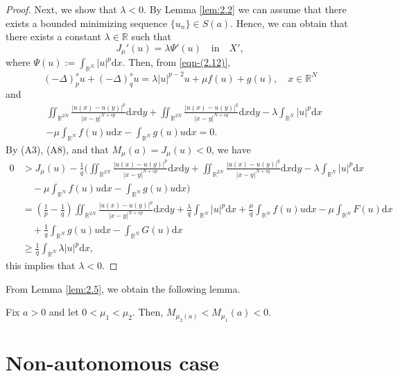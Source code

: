 \documentclass[reqno]{amsart}
\begin{document}
\begin{proof}
Next, we show that $\lambda<0$. By Lemma \ref{lem:2.2} we can assume that there 
exists a bounded minimizing sequence $\{u_n\}\in S(a)$.
Hence, we can obtain that there exists a constant $\lambda\in\mathbb{R}$ 
such that
\begin{equation}\label{eqn-(2.12)}
J_\mu'(u)=\lambda\Psi'(u)\quad  \text{in} \quad X',
\end{equation}
where $\Psi(u):=\int_{\mathbb{R}^N}|u|^{p}\mathrm{d}x$.
Then, from \eqref{eqn-(2.12)},
$$
(-\Delta)_p^{s} u+(-\Delta)_q^{s} u=\lambda |u|^{p-2}u+\mu f(u)+g(u),\quad
 x\in\mathbb{R}^N
$$
and
\begin{align*}
&\iint_{\mathbb{R}^{2N}}\frac{|u(x)-u(y)|^{p}}{|x-y|^{N+sp}}\mathrm{d}x\mathrm{d}y+\iint_{\mathbb{R}^{2N}}\frac{|u(x)-u(y)|^{q}}{|x-y|^{N+sq}}\mathrm{d}x\mathrm{d}y-\lambda \int_{\mathbb{R}^N} |u|^{p}\mathrm{d}x\\
&-\mu \int_{\mathbb{R}^N}f(u)u\mathrm{d}x-\int_{\mathbb{R}^N} g(u)u\mathrm{d}x=0.
\end{align*}
By (A3), (A8), and  that $M_\mu(a)=J_\mu(u)<0$,  we have
\begin{align*}
0&> J_\mu(u)-\frac{1}{q}(\iint_{\mathbb{R}^{2N}}
 \frac{|u(x)-u(y)|^{p}}{|x-y|^{N+sp}}\mathrm{d}x\mathrm{d}y
 +\iint_{\mathbb{R}^{2N}}\frac{|u(x)-u(y)|^{q}}{|x-y|^{N+sq}}\mathrm{d}x
 \mathrm{d}y-\lambda\int_{\mathbb{R}^N} |u|^{p}\mathrm{d}x\\
&\quad -\mu\int_{\mathbb{R}^N} f(u)u\mathrm{d}x-\int_{\mathbb{R}^N}g(u)u\mathrm{d}x)\\
&= (\frac{1}{p}-\frac{1}{q})\iint_{\mathbb{R}^{2N}}\frac{|u(x)-u(y)|^{p}}{|x-y|^{N+sp}}
 \mathrm{d}x\mathrm{d}y+\frac{\lambda}{q}\int_{\mathbb{R}^N} |u|^{p}\mathrm{d}x
 +\frac{\mu}{q} \int_{\mathbb{R}^N} f(u)u\mathrm{d}x-\mu\int_{\mathbb{R}^N}
 F(u)\mathrm{d}x\\
&\quad +\frac{1}{q}\int_{\mathbb{R}^N}g(u)u\mathrm{d}x-\int_{\mathbb{R}^N}
 G(u)\mathrm{d}x\\
&\geq \frac{1}{q}\int_{\mathbb{R}^N}\lambda |u|^{p}\mathrm{d}x,
\end{align*}
this implies that $\lambda<0$.
\end{proof}

From Lemma \ref{lem:2.5},  we obtain the following lemma.

\begin{lemma}\label{cor:2.1} 
Fix $a>0$ and let $0<\mu_1<\mu_2$.
Then, $M_{\mu_2(a)}<M_{\mu_1}(a)<0$.
\end{lemma}

\section{Non-autonomous case}
\end{document}
